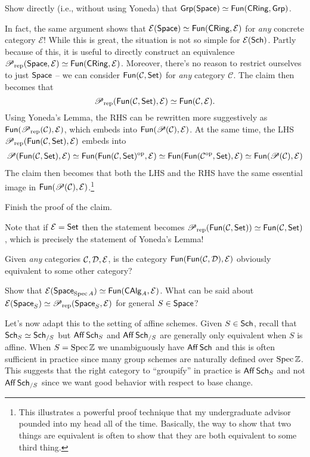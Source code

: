 \documentclass[11pt]{article}
\renewcommand{\C}{\mathcal{C}}
\newcommand{\EE}{\mathcal{E}}
\begin{document}
\begin{exercise}
Show directly (i.e., without using Yoneda) that $\operatorname{\mathsf{Grp}}(\operatorname{\mathsf{Space}})\simeq\operatorname{\mathsf{Fun}}(\operatorname{\mathsf{CRing}},\operatorname{\mathsf{Grp}})$.
\end{exercise}

In fact, the same argument shows that $\EE(\Space)\simeq\Fun(\CRing,\EE)$ for \emph{any} concrete category $\EE$! While this is great, the situation is not so simple for $\EE(\Sch)$. Partly because of this, it is useful to directly construct an equivalence $\Pre_{\rep}(\Space,\EE)\simeq\Fun(\CRing,\EE)$. Moreover, there's no reason to restrict ourselves to just $\operatorname{\mathsf{Space}}$ -- we can consider $\Fun(\C,\Set)$ for \emph{any} category $\C$. The claim then becomes that
$$\Pre_{\rep}(\Fun(\C,\Set),\EE)\simeq\Fun(\C,\EE).$$
Using Yoneda's Lemma, the RHS can be rewritten more suggestively as $\Fun(\Pre_{\rep}(\C),\EE)$, which embeds into $\Fun(\Pre(\C),\EE)$. At the same time, the LHS $\Pre_{\rep}(\Fun(\C,\Set),\EE)$ embeds into 
\begin{align*}
\Pre(\Fun(\C,\Set),\EE)
\simeq\Fun(\Fun(\C,\Set)^{\op},\EE)
\simeq\Fun(\Fun(\C^{\op},\Set),\EE)
\simeq\Fun(\Pre(\C),\EE)
\end{align*}
The claim then becomes that both the LHS and the RHS have the same essential image in $\Fun(\Pre(\C),\EE)$.\footnote{This illustrates a powerful proof technique that my undergraduate advisor pounded into my head all of the time. Basically, the way to show that two things are equivalent is often to show that they are both equivalent to some third thing.}

\begin{exercise}
Finish the proof of the claim.
\end{exercise}

Note that if $\EE=\Set$ then the statement becomes $\Pre_{\rep}(\Fun(\C,\Set))\simeq\Fun(\C,\Set)$, which is precisely the statement of Yoneda's Lemma!

\begin{exercise}
Given \emph{any} categories $\C,\D,\EE$, is the category $\Fun(\Fun(\C,\D),\EE)$ obviously equivalent to some other category?
\end{exercise}

\begin{exercise}
Show that $\EE(\Space_{\Spec A})\simeq\Fun(\CAlg_A,\EE)$. What can be said about $\EE(\Space_S)\simeq\Pre_{\rep}(\Space_S,\EE)$ for general $S\in\operatorname{\mathsf{Space}}$?
\end{exercise}

Let's now adapt this to the setting of affine schemes. Given $S\in\operatorname{\mathsf{Sch}}$, recall that $\operatorname{\mathsf{Sch}}_S\simeq\operatorname{\mathsf{Sch}}_{/S}$ but $\operatorname{\mathsf{Aff}}\operatorname{\mathsf{Sch}}_S$ and $\operatorname{\mathsf{Aff}}\operatorname{\mathsf{Sch}}_{/S}$ are generally only equivalent when $S$ is affine. When $S=\operatorname{Spec}\mathbb{Z}$ we unambiguously have $\operatorname{\mathsf{Aff}}\operatorname{\mathsf{Sch}}$ and this is often sufficient in practice since many group schemes are naturally defined over $\operatorname{Spec}\mathbb{Z}$. This suggests that the right category to ``groupify'' in practice is $\operatorname{\mathsf{Aff}}\operatorname{\mathsf{Sch}}_S$ and not $\operatorname{\mathsf{Aff}}\operatorname{\mathsf{Sch}}_{/S}$ since we want good behavior with respect to base change.
\end{document}
